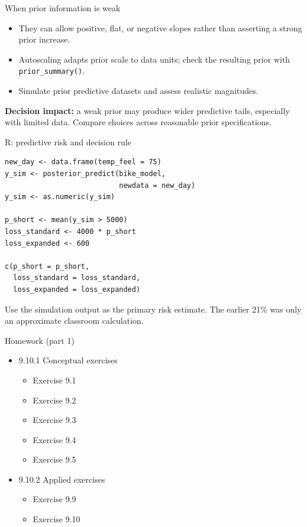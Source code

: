 \documentclass[aspectratio=43,11pt]{beamer}
\begin{document}
\begin{frame}{When prior information is weak}
\begin{itemize}
\item They can allow positive, flat, or negative slopes rather than asserting a strong prior increase.
\item Autoscaling adapts prior scale to data units; check the resulting prior with \texttt{prior\_summary()}.
\item Simulate prior predictive datasets and assess realistic magnitudes.
\end{itemize}
\par\medskip
\textbf{Decision impact:} a weak prior may produce wider predictive tails, especially with limited data. Compare choices across reasonable prior specifications.
\end{frame}

\begin{frame}[fragile]{R: predictive risk and decision rule}
\footnotesize
\begin{verbatim}
new_day <- data.frame(temp_feel = 75)
y_sim <- posterior_predict(bike_model,
                           newdata = new_day)
y_sim <- as.numeric(y_sim)

p_short <- mean(y_sim > 5000)
loss_standard <- 4000 * p_short
loss_expanded <- 600

c(p_short = p_short,
  loss_standard = loss_standard,
  loss_expanded = loss_expanded)
\end{verbatim}
\scriptsize Use the simulation output as the primary risk estimate. The earlier 21\% was only an approximate classroom calculation.
\end{frame}

\begin{frame}{Homework (part 1)}
\begin{itemize}
\item[] 9.10.1 Conceptual exercises
\begin{itemize}
\item Exercise 9.1
\item Exercise 9.2
\item Exercise 9.3
\item Exercise 9.4
\item Exercise 9.5
\end{itemize}
\item[] 9.10.2 Applied exercises
\begin{itemize}
\item Exercise 9.9
\item Exercise 9.10
\end{itemize}
\end{itemize}
\end{frame}
\end{document}

